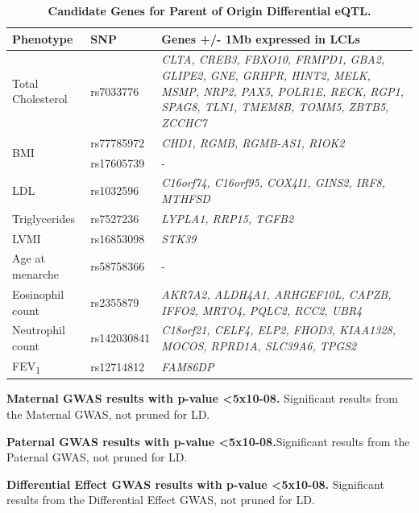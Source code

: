 \begin{table}
\centering
\begin{adjustbox}{width={\textwidth}}
\begin{tabular}{@{}p{5cm}|p{5cm}|p{10cm}@{}}
\toprule Phenotype & SNP & Genes +/- 1Mb expressed in LCLs \\ \midrule
Total Cholesterol & rs7033776 & \emph{CLTA, CREB3, FBXO10, FRMPD1, GBA2, GLIPE2, GNE, GRHPR, HINT2, MELK, MSMP, NRP2, PAX5, POLR1E, RECK, RGP1, SPAG8, TLN1, TMEM8B, TOMM5, ZBTB5, ZCCHC7} \\ \hline
\multirow{2}{5cm}{BMI} & rs77785972 & \emph{CHD1, RGMB, RGMB-AS1, RIOK2} \\ \cline{2-3}
 &  rs17605739	 & - \\ \hline
LDL & rs1032596 & \emph{C16orf74, C16orf95, COX4I1, GINS2, IRF8, MTHFSD}\\ \hline
Triglycerides & rs7527236 & \emph{LYPLA1, RRP15, TGFB2}\\ \hline
LVMI	 & rs16853098 & \emph{STK39} \\ \hline
Age at menarche & rs58758366 & -\\ \hline
Eosinophil count & rs2355879 & \emph{AKR7A2, ALDH4A1, ARHGEF10L, CAPZB, IFFO2, MRTO4, PQLC2, RCC2, UBR4}\\ \hline
Neutrophil count & rs142030841 & \emph{C18orf21, CELF4, ELP2, FHOD3, KIAA1328, MOCOS, RPRD1A, SLC39A6, TPGS2} \\ \hline
FEV\textsubscript{1} & rs12714812 & \emph{FAM86DP} \\ \bottomrule
\end{tabular}
\end{adjustbox}
\caption[Candidate Genes for Parent of Origin Differential eQTL. ]{\textbf{Candidate Genes for Parent of Origin Differential eQTL.}}
\label{tab:tab-s4}
\end{table}



\begin{table}
\caption[Maternal GWAS results with p-value \textless 5x10-08. ]{\textbf{Maternal GWAS results with p-value \textless 5x10-08.} Significant results from the Maternal GWAS, not pruned for LD. }
\label{tab:tab-s5}
\end{table}


\begin{table}
\caption[Paternal GWAS results with p-value \textless 5x10-08. ]{\textbf{Paternal GWAS results with p-value \textless 5x10-08.}Significant results from the Paternal GWAS, not pruned for LD.}
\label{tab:tab-s6}
\end{table}


\begin{table}
\caption[Differential Effect GWAS results with p-value \textless 5x10-08. ]{\textbf{Differential Effect  GWAS results with p-value \textless 5x10-08.} Significant results from the Differential Effect GWAS, not pruned for LD.}
\end{table}


